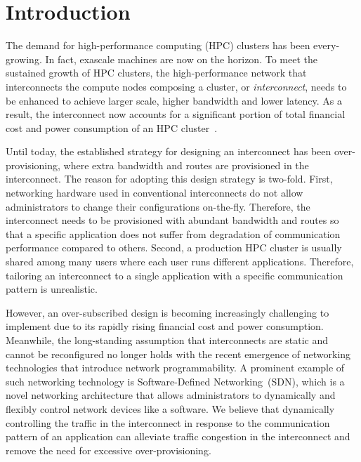 \documentclass[graybox]{svmult}
\begin{document}
\section{Introduction}\label{kt:sec:i}

The demand for high-performance computing (HPC) clusters has been
every-growing. In fact, exascale machines are now on the horizon. To meet the
sustained growth of HPC clusters, the high-performance network that
interconnects the compute nodes composing a cluster, or \textit{interconnect},
needs to be enhanced to achieve larger scale, higher bandwidth and lower
latency. As a result, the interconnect now accounts for a significant portion
of total financial cost and power consumption of an HPC
cluster~\cite{Michelogiannakis2017}.

Until today, the established strategy for designing an interconnect has been
over-provisioning, where extra bandwidth and routes are provisioned in the
interconnect. The reason for adopting this design strategy is two-fold. First,
networking hardware used in conventional interconnects do not allow
administrators to change their configurations on-the-fly. Therefore, the
interconnect needs to be provisioned with abundant bandwidth and routes so
that a specific application does not suffer from degradation of communication
performance compared to others. Second, a production HPC cluster is usually
shared among many users where each user runs different applications.
Therefore, tailoring an interconnect to a single application with a specific
communication pattern is unrealistic.

However, an over-subscribed design is becoming increasingly challenging to
implement due to its rapidly rising financial cost and power consumption.
Meanwhile, the long-standing assumption that interconnects are static and
cannot be reconfigured no longer holds with the recent emergence of networking
technologies that introduce network programmability. A prominent example of
such networking technology is Software-Defined Networking~(SDN), which is a
novel networking architecture that allows administrators to dynamically and
flexibly control network devices like a software. We believe that dynamically
controlling the traffic in the interconnect in response to the communication
pattern of an application can alleviate traffic congestion in the interconnect
and remove the need for excessive over-provisioning.
\end{document}
